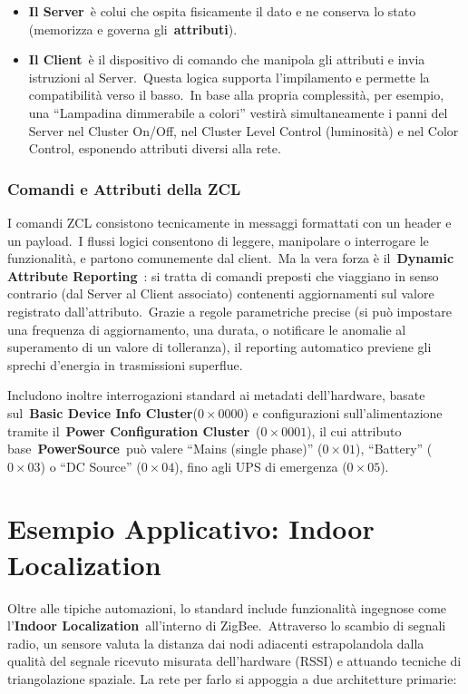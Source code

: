 \documentclass[
  italian,
  openany]{book}
\begin{document}
\begin{itemize}
\item
  \textbf{Il Server}~è colui che ospita fisicamente il dato e ne
  conserva lo stato (memorizza e governa gli~\textbf{attributi}).
\item
  \textbf{Il Client}~è il dispositivo di comando che manipola gli
  attributi e invia istruzioni al Server.~Questa logica supporta
  l'impilamento e permette la compatibilità verso il basso.~In base alla
  propria complessità, per esempio, una ``Lampadina dimmerabile a
  colori'' vestirà simultaneamente i panni del Server nel Cluster
  On/Off, nel Cluster Level Control (luminosità) e nel Color Control,
  esponendo attributi diversi alla rete.
\end{itemize}

\subsubsection{Comandi e Attributi della
ZCL}\label{comandi-e-attributi-della-zcl}

I comandi ZCL consistono tecnicamente in messaggi formattati con un
header e un payload.~I flussi logici consentono di leggere, manipolare o
interrogare le funzionalità, e partono comunemente dal client.~Ma la
vera forza è il~\textbf{Dynamic Attribute Reporting}~: si tratta di
comandi preposti che viaggiano in senso contrario (dal Server al Client
associato) contenenti aggiornamenti sul valore registrato
dall'attributo.~Grazie a regole parametriche precise (si può impostare
una frequenza di aggiornamento, una durata, o notificare le anomalie al
superamento di un valore di tolleranza), il reporting automatico
previene gli sprechi d'energia in trasmissioni superflue.

Includono inoltre interrogazioni standard ai metadati dell'hardware,
basate sul~\textbf{Basic Device Info Cluster}(\(0\times0000\)) e
configurazioni sull'alimentazione tramite il~\textbf{Power Configuration
Cluster}~(\(0\times0001\)), il cui attributo
base~\textbf{PowerSource}~può valere ``Mains (single phase)''
(\(0\times01\)), ``Battery'' (\(0\times03\)) o ``DC Source''
(\(0\times04\)), fino agli UPS di emergenza (\(0\times05\)).

\section{Esempio Applicativo: Indoor
Localization}\label{esempio-applicativo-indoor-localization}

Oltre alle tipiche automazioni, lo standard include funzionalità
ingegnose come l'\textbf{Indoor Localization}~all'interno di
ZigBee.~Attraverso lo scambio di segnali radio, un sensore valuta la
distanza dai nodi adiacenti estrapolandola dalla qualità del segnale
ricevuto misurata dell'hardware (RSSI) e attuando tecniche di
triangolazione spaziale. La rete per farlo si appoggia a due
architetture primarie:
\end{document}
